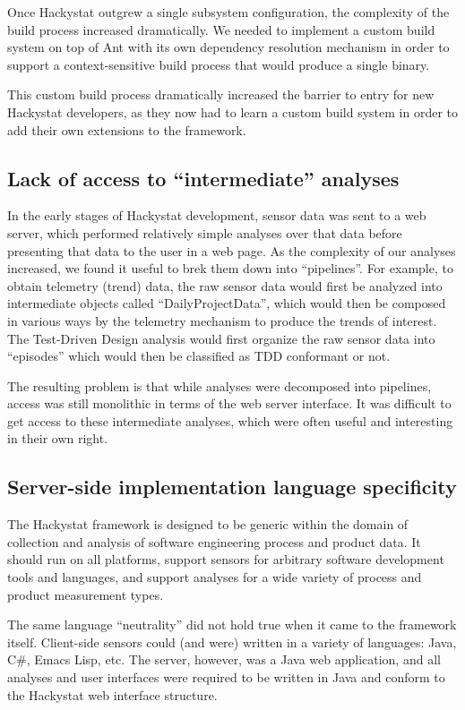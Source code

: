 \documentclass[conference,compsoc,peerreview]{IEEEtran}
\begin{document}
Once Hackystat outgrew a single subsystem configuration, the complexity of the build process increased dramatically. We needed to implement a custom build system on top of Ant with its own dependency resolution mechanism in order to support a context-sensitive build process that would produce a single binary.  

This custom build process dramatically increased the barrier to entry for new Hackystat developers, as they now had to learn a custom build system in order to add their own extensions to the framework.

\subsection{Lack of access to ``intermediate'' analyses}

In the early stages of Hackystat development, sensor data was sent to a web server, which performed relatively simple analyses over that data before presenting that data to the user in a web page.   As the complexity of our analyses increased, we found it useful to brek them down into ``pipelines''.  For example, to obtain telemetry (trend) data, the raw sensor data would first be analyzed into intermediate objects called ``DailyProjectData'', which would then be composed in various ways by the telemetry mechanism to produce the trends of interest.  The Test-Driven Design analysis would first organize the raw sensor data into ``episodes'' which would then be classified as TDD conformant or not. 

The resulting problem is that while analyses were decomposed into pipelines, access was still monolithic in terms of the web server interface. It was difficult to get access to these intermediate analyses, which were often useful and interesting in their own right. 

\subsection{Server-side implementation language specificity}

The Hackystat framework is designed to be generic within the domain of collection and analysis of software engineering process and product data.  It should run on all platforms, support sensors for arbitrary software development tools and languages, and support analyses for a wide variety of process and product measurement types. 

The same language ``neutrality'' did not hold true when it came to the framework itself.  Client-side sensors could (and were) written in a variety of languages: Java, C\#, Emacs Lisp, etc. The server, however, was a Java web application, and all analyses and user interfaces were required to be written in Java and conform to the Hackystat web interface structure.  
\end{document}

